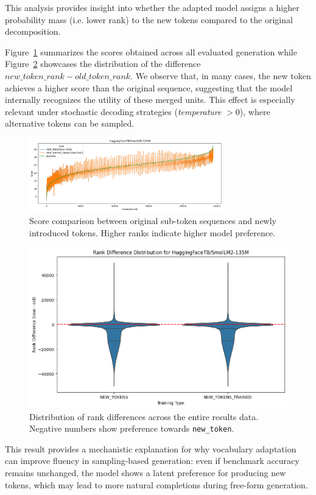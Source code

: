 This analysis provides insight into whether the adapted model assigns a higher probability mass (i.e. lower rank) to the new tokens compared to the original decomposition.  

Figure~\ref{fig:new_token_rank} summarizes the scores obtained across all evaluated generation while Figure~\ref{fig:violin_rank_dist} showcases the distribution of the difference $new\_token\_rank - old\_token\_rank$. We observe that, in many cases, the new token achieves a higher score than the original sequence, suggesting that the model internally recognizes the utility of these merged units. This effect is especially relevant under stochastic decoding strategies (\textit{temperature} $>0$), where alternative tokens can be sampled.  

\begin{figure}[H]
    \centering
    \includegraphics[width=0.75\textwidth]{Figures/rank_distribution_smolLM2.png}
    \caption{Score comparison between original sub-token sequences and newly introduced tokens. Higher ranks indicate higher model preference.}
    \label{fig:new_token_rank}
\end{figure}

\begin{figure}[H]
    \centering
    \includegraphics[width=1\textwidth]{Figures/rank_diff_dist_violin.png}
    \caption{Distribution of rank differences across the entire results data. Negative numbers show preference towards \texttt{new\_token}.}
    \label{fig:violin_rank_dist}
\end{figure}
This result provides a mechanistic explanation for why vocabulary adaptation can improve fluency in sampling-based generation: even if benchmark accuracy remains unchanged, the model shows a latent preference for producing new tokens, which may lead to more natural completions during free-form generation.
 


